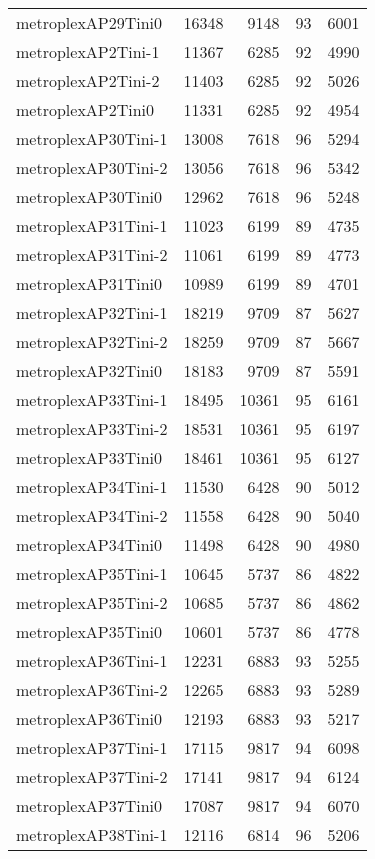 \begin{longtable}{lrrrr}
metroplexAP29Tini0 & 16348 & 9148 & 93 & 6001 \\
metroplexAP2Tini-1 & 11367 & 6285 & 92 & 4990 \\
metroplexAP2Tini-2 & 11403 & 6285 & 92 & 5026 \\
metroplexAP2Tini0 & 11331 & 6285 & 92 & 4954 \\
metroplexAP30Tini-1 & 13008 & 7618 & 96 & 5294 \\
metroplexAP30Tini-2 & 13056 & 7618 & 96 & 5342 \\
metroplexAP30Tini0 & 12962 & 7618 & 96 & 5248 \\
metroplexAP31Tini-1 & 11023 & 6199 & 89 & 4735 \\
metroplexAP31Tini-2 & 11061 & 6199 & 89 & 4773 \\
metroplexAP31Tini0 & 10989 & 6199 & 89 & 4701 \\
metroplexAP32Tini-1 & 18219 & 9709 & 87 & 5627 \\
metroplexAP32Tini-2 & 18259 & 9709 & 87 & 5667 \\
metroplexAP32Tini0 & 18183 & 9709 & 87 & 5591 \\
metroplexAP33Tini-1 & 18495 & 10361 & 95 & 6161 \\
metroplexAP33Tini-2 & 18531 & 10361 & 95 & 6197 \\
metroplexAP33Tini0 & 18461 & 10361 & 95 & 6127 \\
metroplexAP34Tini-1 & 11530 & 6428 & 90 & 5012 \\
metroplexAP34Tini-2 & 11558 & 6428 & 90 & 5040 \\
metroplexAP34Tini0 & 11498 & 6428 & 90 & 4980 \\
metroplexAP35Tini-1 & 10645 & 5737 & 86 & 4822 \\
metroplexAP35Tini-2 & 10685 & 5737 & 86 & 4862 \\
metroplexAP35Tini0 & 10601 & 5737 & 86 & 4778 \\
metroplexAP36Tini-1 & 12231 & 6883 & 93 & 5255 \\
metroplexAP36Tini-2 & 12265 & 6883 & 93 & 5289 \\
metroplexAP36Tini0 & 12193 & 6883 & 93 & 5217 \\
metroplexAP37Tini-1 & 17115 & 9817 & 94 & 6098 \\
metroplexAP37Tini-2 & 17141 & 9817 & 94 & 6124 \\
metroplexAP37Tini0 & 17087 & 9817 & 94 & 6070 \\
metroplexAP38Tini-1 & 12116 & 6814 & 96 & 5206 \\

\end{longtable}
